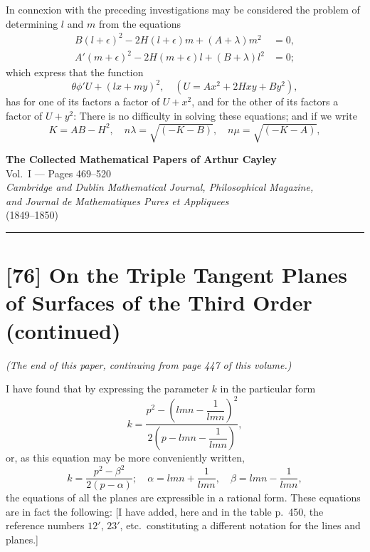 \documentclass[11pt,a4paper]{book}
\begin{document}
In connexion with the preceding investigations may be considered the problem of determining $l$ and $m$ from the equations
\begin{align*}
B(l + \epsilon)^{2} - 2H(l + \epsilon)m + (A + \lambda)m^{2} &= 0, \\
A'(m + \epsilon)^{2} - 2H(m + \epsilon)l + (B + \lambda)l^{2} &= 0;
\end{align*}
which express that the function
\[
\theta\phi' U + (lx + my)^{2}, \quad (U = Ax^{2} + 2Hxy + By^{2}),
\]
has for one of its factors a factor of $U + x^{2}$, and for the other of its factors a factor of $U + y^{2}$: There is no difficulty in solving these equations; and if we write
\[
K = AB - H^{2}, \quad n\lambda = \sqrt{(-K - B)}, \quad n\mu = \sqrt{(-K - A)},
\]
\clearpage


\begin{center}
{\Large\textbf{The Collected Mathematical Papers of Arthur Cayley}}\\[6pt]
{\large Vol.~I --- Pages 469--520}\\[12pt]
\textit{Cambridge and Dublin Mathematical Journal, Philosophical Magazine,}\\
\textit{and Journal de Mathematiques Pures et Appliquees}\\
(1849--1850)
\end{center}

\hrule
\bigskip

\section*{[76] On the Triple Tangent Planes of Surfaces of the Third Order (continued)}

\bigskip

\noindent\textit{(The end of this paper, continuing from page 447 of this volume.)}
\medskip

I have found that by expressing the parameter $k$ in the particular form
\[
k = \frac{p^2 - \left(lmn - \dfrac{1}{lmn}\right)^2}{2\left(p - lmn - \dfrac{1}{lmn}\right)},
\]
or, as this equation may be more conveniently written,
\begin{equation}
k = \frac{p^2 - \beta^2}{2(p - \alpha)}; \quad \alpha = lmn + \frac{1}{lmn}, \quad \beta = lmn - \frac{1}{lmn},\tag{1}
\end{equation}
the equations of all the planes are expressible in a rational form. These equations are in fact the following: [I have added, here and in the table p.~450, the reference numbers $12'$, $23'$, etc.\ constituting a different notation for the lines and planes.]
\medskip
\end{document}
